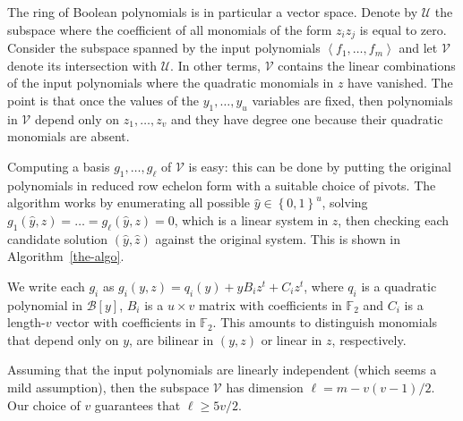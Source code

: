 \documentclass[a4paper,UKenglish,cleveref, autoref]{lipics-v2019}
\newcommand{\bits}{\left\{0, 1\right\}}
\newcommand{\red}{\color{red}}
\newcommand{\TODO}[1]{{\red \textbf{TODO}:} #1\xspace}
\begin{document}

The ring of Boolean polynomials is in particular a vector space. Denote by
$\mathcal{U}$ the subspace where the coefficient of all monomials of the form
$z_i z_j$ is equal to zero. Consider the subspace spanned by the input
polynomials $\left\langle f_1, \dots, f_m\right\rangle$ and let $\mathcal{V}$
denote its intersection with $\mathcal{U}$. In other terms, $\mathcal{V}$
contains the linear combinations of the input polynomials where the quadratic
monomials in $z$ have vanished. The point is that once the values of the
$y_1, \dots, y_u$ variables are fixed, then polynomials in $\mathcal{V}$ depend
only on $z_1, \dots, z_v$ and they have degree one because their quadratic
monomials are absent.

Computing a basis $g_1, \dots, g_\ell$ of $\mathcal{V}$ is easy: this can be
done by putting the original polynomials in reduced row echelon form with a
suitable choice of pivots. The algorithm works by enumerating all possible
$\hat y \in \bits^u$, solving $g_1(\hat y, z) = \dots = g_\ell(\hat y, z) = 0$,
which is a linear system in $z$, then checking each candidate solution
$(\hat y, \hat z)$ against the original system. This is shown in
Algorithm~\ref{the-algo}.

We write each $g_i$ as $g_i(y, z) = q_i(y) + y B_i z^t + C_i z^t$, where $q_i$
is a quadratic polynomial in $\mathcal{B}[y]$, $B_i$ is a $u \times v$ matrix
with coefficients in $\mathbb{F}_2$ and $C_i$ is a length-$v$ vector with
coefficients in $\mathbb{F}_2$. This amounts to distinguish monomials that
depend only on $y$, are bilinear in $(y, z)$ or linear in $z$, respectively.

Assuming that the input polynomials are linearly independent (which seems a mild
assumption), then the subspace $\mathcal{V}$ has dimension
$\ell = m - v(v-1)/2$. Our choice of $v$ guarantees that $\ell \geq 5v/2$.
\end{document}
